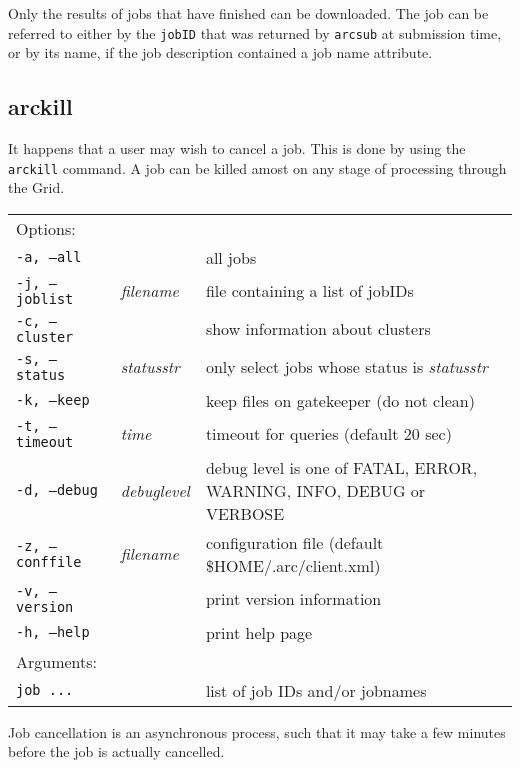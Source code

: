 Only the results of jobs that have finished can be downloaded. The job
can be referred to either by the \texttt{jobID} that was returned by
\texttt{arcsub} at submission time, or by its name, if the job
description contained a job name attribute.

\subsection{arckill}
\label{sec:arckill}

It happens that a user may wish to cancel a job. This is done by using
the \texttt{arckill}  command. A
job can be killed amost on any stage of processing through the Grid.

\hspace*{0.5cm}
\begin{shaded}
\end{shaded}
\begin{longtable}{llp{8cm}}
   Options:&&\\
   \texttt{-a, --all}& & all jobs\\
   \texttt{-j, --joblist}& \textit{filename} & file containing a list of jobIDs\\
   \texttt{-c, --cluster}& & show information about clusters\\
   \texttt{-s, --status}& \textit{statusstr} &only select jobs whose status is \textit{statusstr}\\
   \texttt{-k, --keep}& & keep files on gatekeeper (do not clean)\\
   \texttt{-t, --timeout}& \textit{time} & timeout for queries (default 20 sec)\\
   \texttt{-d, --debug}& \textit{debuglevel}&debug level is one of  FATAL, ERROR, WARNING, INFO, DEBUG or VERBOSE\\
   \texttt{-z, --conffile}&\textit{filename}& configuration file (default {\$}HOME/.arc/client.xml)\\
   \texttt{-v, --version}& & print version information\\
   \texttt{-h, --help}& & print help page\\
   Arguments:&&\\
   \texttt{job ...} && list of job IDs and/or jobnames\\
\end{longtable}

\begin{framed}
   Job cancellation is an asynchronous process, such that it
   may take a few minutes before the job is actually cancelled.
\end{framed}

